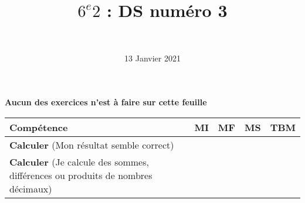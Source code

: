 \documentclass[a4paper,11pt]{exam}
\author{\ }
\date{13 Janvier 2021}
\title{$6^e 2$ : DS num\'ero 3}
\begin{document}
%	

	\maketitle
	
\begin{center}
	\textbf{Aucun des exercices n'est à faire sur cette feuille}
\end{center}

\begin{small}
	\begin{center}
		\begin{tabular}{|@{\ }l@{\ }|@{\ }c@{\ }|@{\ }c@{\ }|@{\ }c@{\ }|@{\ }c@{\ }|}
			\hline
			\textbf{Compétence} & \textbf{MI} & \textbf{MF} & \textbf{MS} & \textbf{TBM} \\
			\hline
			\textbf{Calculer} (Mon résultat semble correct) &  \ \ & \ \ & \ \ & \ \  \\
			\hline
			\textbf{Calculer} (Je calcule des sommes, différences ou produits de nombres décimaux)&  \ \ & \ \ & \ \ & \ \  \\
			\hline	
%			 
		\end{tabular}
	\end{center}
\end{small}	

	
	
%	







\newpage









\label{LastPage}

%
\end{document}
